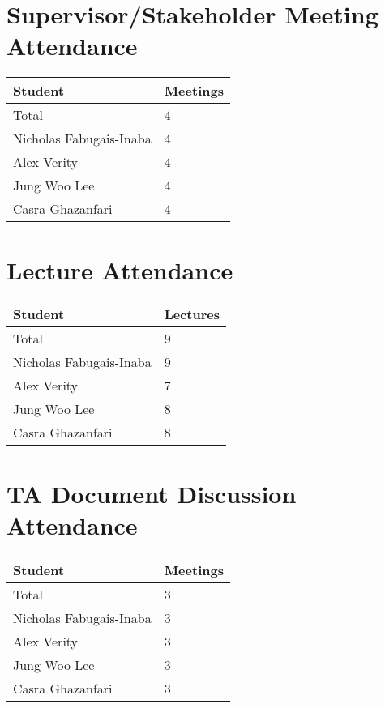 \documentclass{article}
\begin{document}
\section{Supervisor/Stakeholder Meeting Attendance}

\begin{table}[H]
\centering
\begin{tabular}{ll}
\toprule
\textbf{Student} & \textbf{Meetings}\\
\midrule
Total & 4\\
Nicholas Fabugais-Inaba & 4 \\
Alex Verity & 4 \\
Jung Woo Lee & 4 \\
Casra Ghazanfari & 4 \\
\bottomrule
\end{tabular}
\end{table}

\section{Lecture Attendance}

\begin{table}[H]
\centering
\begin{tabular}{ll}
\toprule
\textbf{Student} & \textbf{Lectures}\\
\midrule
Total & 9\\
Nicholas Fabugais-Inaba & 9 \\
Alex Verity & 7 \\
Jung Woo Lee & 8 \\
Casra Ghazanfari & 8 \\
\bottomrule
\end{tabular}
\end{table}

\section{TA Document Discussion Attendance}

\begin{table}[H]
\centering
\begin{tabular}{ll}
\toprule
\textbf{Student} & \textbf{Meetings}\\
\midrule
Total & 3\\
Nicholas Fabugais-Inaba & 3 \\
Alex Verity & 3 \\
Jung Woo Lee & 3 \\
Casra Ghazanfari & 3 \\
\bottomrule
\end{tabular}
\end{table}
\end{document}
